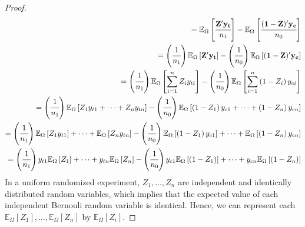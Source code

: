 \documentclass[12pt,leqno]{article}
\theoremstyle{newstyle}
\begin{document}
\begin{proof}
\begin{align*}
= \mathbb{E}_{\Omega} \left[\cfrac{\mathbf{Z}^{\prime} \mathbf{y_t}}{n_1}\right] - \mathbb{E}_{\Omega}\left[\cfrac{(\mathbf{1} - \mathbf{Z})^{\prime} \mathbf{y_c}}{n_0}\right] \\
= \left(\cfrac{1}{n_1} \right) \mathbb{E}_{\Omega} \left[\mathbf{Z}^{\prime} \mathbf{y_t}\right] - \left(\cfrac{1}{n_0}\right) \mathbb{E}_{\Omega}\left[(\mathbf{1} - \mathbf{Z})^{\prime} \mathbf{y_c}\right] \\
= \left(\cfrac{1}{n_1} \right) \mathbb{E}_{\Omega} \left[ \sum \limits_{i = 1}^n Z_i y_{ti}\right] - \left(\cfrac{1}{n_0}\right) \mathbb{E}_{\Omega}\left[\sum \limits_{i = 1}^n \left(1 - Z_i\right) y_{ci} \right] \\
= \left(\cfrac{1}{n_1} \right) \mathbb{E}_{\Omega} \left[ Z_1 y_{t1} + \dots + Z_n y_{tn}\right] - \left(\cfrac{1}{n_0}\right) \mathbb{E}_{\Omega}\left[\left(1 - Z_1\right) y_{c1} + \dots + \left(1 - Z_n\right) y_{cn} \right] \\
= \left(\cfrac{1}{n_1} \right) \mathbb{E}_{\Omega} \left[ Z_1 y_{t1}\right] + \dots + \mathbb{E}_{\Omega} \left[Z_n y_{tn}\right] - \left(\cfrac{1}{n_0}\right) \mathbb{E}_{\Omega}\left[\left(1 - Z_1\right) y_{c1}\right] + \dots + \mathbb{E}_{\Omega} \left[\left(1 - Z_n\right) y_{cn} \right] \\
= \left(\cfrac{1}{n_1} \right) y_{t1}\mathbb{E}_{\Omega} \left[ Z_1 \right] + \dots + y_{tn}\mathbb{E}_{\Omega} \left[Z_n\right] - \left(\cfrac{1}{n_0}\right) y_{c1}\mathbb{E}_{\Omega}\left[\left(1 - Z_1\right) \right] + \dots + y_{cn}\mathbb{E}_{\Omega} \left[\left(1 - Z_n\right) \right] \\
\end{align*}
In a uniform randomized experiment, $Z_1, \dots , Z_n$ are independent and identically distributed random variables, which implies that the expected value of each independent Bernouli random variable is identical. Hence, we can represent each $\mathbb{E}_{\Omega} \left[ Z_1 \right], \dots , \mathbb{E}_{\Omega} \left[ Z_n \right]$ by $\mathbb{E}_{\Omega} \left[ Z_i \right]$.


\end{proof}
\end{document}
